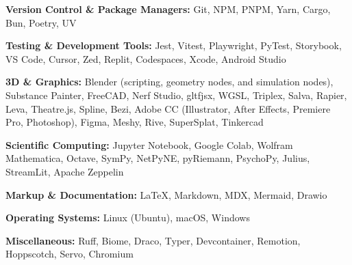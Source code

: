 {  \item \textbf{Version Control \& Package Managers:} Git, NPM, PNPM, Yarn, Cargo, Bun, Poetry, UV

  \item \textbf{Testing \& Development Tools:} Jest, Vitest, Playwright, PyTest, Storybook, VS Code, Cursor, Zed, Replit, Codespaces, Xcode, Android Studio

  \item \textbf{3D \& Graphics:} Blender (scripting, geometry nodes, and simulation nodes), Substance Painter, FreeCAD, Nerf Studio, gltfjsx, WGSL, Triplex, Salva, Rapier, Leva, Theatre.js, Spline, Bezi, Adobe CC (Illustrator, After Effects, Premiere Pro, Photoshop), Figma, Meshy, Rive, SuperSplat, Tinkercad

  \item \textbf{Scientific Computing:} Jupyter Notebook, Google Colab, Wolfram Mathematica, Octave, SymPy, NetPyNE, pyRiemann, PsychoPy, Julius, StreamLit, Apache Zeppelin

  \item \textbf{Markup \& Documentation:} LaTeX, Markdown, MDX, Mermaid, Drawio

  \item \textbf{Operating Systems:} Linux (Ubuntu), macOS, Windows

  \item \textbf{Miscellaneous:} Ruff, Biome, Draco, Typer, Devcontainer, Remotion, Hoppscotch, Servo, Chromium
}

